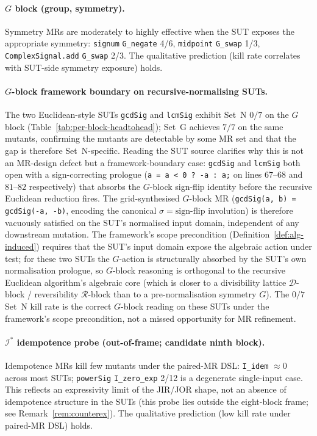 \documentclass[manuscript]{acmart}
\begin{document}
\paragraph{$G$ block (group, symmetry).}
Symmetry MRs are moderately to highly effective when the SUT exposes
the appropriate symmetry: \texttt{signum} \texttt{G\_negate} 4/6,
\texttt{midpoint} \texttt{G\_swap} 1/3, \texttt{ComplexSignal.add}
\texttt{G\_swap} 2/3. The qualitative prediction (kill rate correlates
with SUT-side symmetry exposure) holds.

\paragraph{$G$-block framework boundary on recursive-normalising SUTs.}
\label{para:g-block-euclidean-boundary}
The two Euclidean-style SUTs \texttt{gcdSig} and \texttt{lcmSig}
exhibit Set~N $0/7$ on the $G$ block (Table~\ref{tab:per-block-headtohead});
Set~G achieves $7/7$ on the same mutants, confirming the mutants are
detectable by some MR set and that the gap is therefore Set~N-specific.
Reading the SUT source clarifies why this is not an MR-design defect
but a framework-boundary case: \texttt{gcdSig} and \texttt{lcmSig}
both open with a sign-correcting prologue (\texttt{a = a < 0 ? -a : a;}
on lines $67$--$68$ and $81$--$82$ respectively) that absorbs the
$G$-block sign-flip identity before the recursive Euclidean reduction
fires. The grid-synthesised $G$-block MR
(\texttt{gcdSig(a, b) = gcdSig(-a, -b)}, encoding the canonical
$\sigma = \mathrm{sign\text{-}flip}$ involution) is therefore vacuously
satisfied on the SUT's normalised input domain, independent of any
downstream mutation. The framework's scope precondition
(Definition~\ref{def:alg-induced}) requires that the SUT's input
domain expose the algebraic action under test; for these two SUTs the
$G$-action is structurally absorbed by the SUT's own normalisation
prologue, so $G$-block reasoning is orthogonal to the recursive
Euclidean algorithm's algebraic core (which is closer to a divisibility
lattice $\mathcal{D}$-block / reversibility $\mathcal{R}$-block than
to a pre-normalisation symmetry $G$). The $0/7$ Set~N kill rate is the
correct $G$-block reading on these SUTs under the framework's
scope precondition, not a missed opportunity for MR refinement.

\paragraph{$\mathcal{I}^{*}$ idempotence probe (out-of-frame; candidate ninth block).}
Idempotence MRs kill few mutants under the paired-MR DSL:
\texttt{I\_idem} $\approx 0$ across most SUTs; \texttt{powerSig}
\texttt{I\_zero\_exp} 2/12 is a degenerate single-input case. This
reflects an expressivity limit of the JIR/JOR shape, not an absence
of idempotence structure in the SUTs (this probe lies outside the
eight-block frame; see Remark~\ref{rem:counterex}). The qualitative
prediction (low kill rate under paired-MR DSL) holds.
\end{document}
